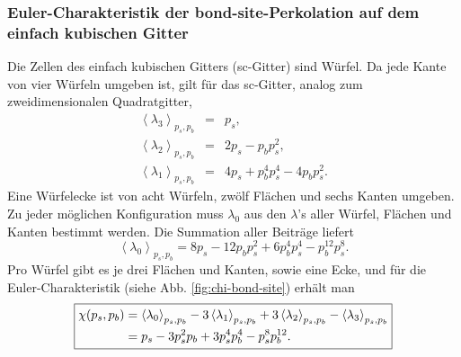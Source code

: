 \subsubsection{Euler-Charakteristik der bond-site-Perkolation auf dem einfach kubischen Gitter}
\label{sec:bondsitesc}
Die Zellen des einfach kubischen Gitters (sc-Gitter) sind W\"urfel. Da jede Kante von vier W\"urfeln umgeben ist, gilt f\"ur das sc-Gitter, analog zum zweidimensionalen Quadratgitter,
\begin{eqnarray} 
  \left<\lambda_3\right>_{p_s,p_b} &=& p_s,\\
  \left<\lambda_2\right>_{p_s,p_b} &=& 2p_s-p_bp_s^2,\\
  \left<\lambda_1\right>_{p_s,p_b} &=& 4p_s+p_b^4p_s^4-4p_bp_s^2.
\end{eqnarray}
Eine W\"urfelecke ist von acht W\"urfeln, zw\"olf Fl\"achen und sechs Kanten umgeben. Zu jeder m\"oglichen Konfiguration muss $\lambda_0$ aus den $\lambda$'s aller W\"urfel, Fl\"achen und Kanten bestimmt werden. 
Die Summation aller Beitr\"age liefert 
\begin{equation}
\left<\lambda_0\right>_{p_s,p_b}=8p_s-12p_bp_s^2+6p_b^4p_s^4-p_b^{12}p_s^8.
\end{equation}
Pro W\"urfel gibt es je drei Fl\"achen und Kanten, sowie eine Ecke, und f\"ur die Euler-Charakter\-istik (siehe Abb.  \ref{fig:chi-bond-site}) erh\"alt man  
\begin{equation}
  \label{eq:bondsitesc}
\fbox{$
\begin{split}
\chi(p_s,p_b)&=  \left<\lambda_0\right>_{p_s,p_b}-3\left<\lambda_1\right>_{p_s,p_b}+3\left<\lambda_2\right>_{p_s,p_b}-\left<\lambda_3\right>_{p_s,p_b}\\
&= p_s-3p_s^2p_b+3p_s^4p_b^4-p_s^8p_b^{12}.
\end{split}$}
\end{equation}\\

